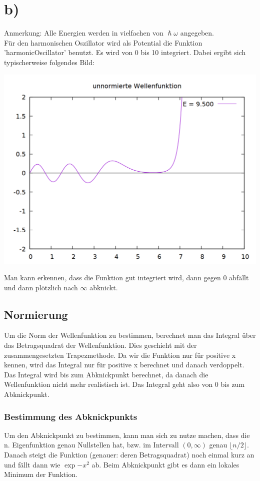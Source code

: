 \documentclass{scrreprt}
\begin{document}
\section*{b)}
Anmerkung: Alle Energien werden in vielfachen von $\hslash \omega$ angegeben.\\

Für den harmonischen Oszillator wird als Potential die Funktion 'harmonicOscillator' benutzt. Es wird von 0 bis 10 integriert. Dabei ergibt sich typischerweise folgendes Bild:
\begin{center}
\includegraphics[scale=0.3]{aufgabe3/plot_unnorm.png}
\end{center}

Man kann erkennen, dass die Funktion gut integriert wird, dann gegen 0 abfällt und dann plötzlich nach $\infty$ abknickt.

\subsection*{Normierung}
Um die Norm der Wellenfunktion zu bestimmen, berechnet man das Integral über das Betragsquadrat der Wellenfunktion. Dies geschieht mit der zusammengesetzten Trapezmethode. Da wir die Funktion nur für positive x kennen, wird das Integral nur für positive x berechnet und danach verdoppelt. Das Integral wird bis zum Abknickpunkt berechnet, da danach die Wellenfunktion nicht mehr realistisch ist. Das Integral geht also von 0 bis zum Abknickpunkt.

\subsubsection*{Bestimmung des Abknickpunkts}
Um den Abknickpunkt zu bestimmen, kann man sich zu nutze machen, dass die n. Eigenfunktion genau Nullstellen hat, bzw. im Intervall $(0,\infty)$ genau $\lfloor n/2\rfloor$. Danach steigt die Funktion (genauer: deren Betragsquadrat) noch einmal kurz an und fällt dann wie $\exp{-x^2}$ ab. Beim Abknickpunkt gibt es dann ein lokales Minimum der Funktion.\\
\end{document}
